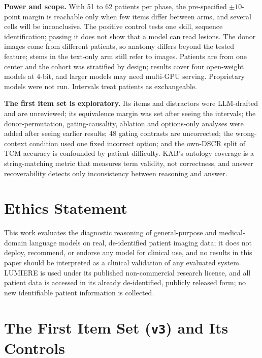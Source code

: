 \documentclass[11pt]{article}
\begin{document}
\textbf{Power and scope.} With 51 to 62 patients per phase, the pre-specified $\pm10$-point margin is reachable only when few items differ between arms, and several cells will be inconclusive. The positive control tests one skill, sequence identification; passing it does not show that a model can read lesions. The donor images come from different patients, so anatomy differs beyond the tested feature; stems in the text-only arm still refer to images. Patients are from one center and the cohort was stratified by design; results cover four open-weight models at 4-bit, and larger models may need multi-GPU serving. Proprietary models were not run. Intervals treat patients as exchangeable.

\textbf{The first item set is exploratory.} Its items and distractors were LLM-drafted and are unreviewed; its equivalence margin was set after seeing the intervals; the donor-permutation, gating-causality, ablation and options-only analyses were added after seeing earlier results; 48 gating contrasts are uncorrected; the wrong-context condition used one fixed incorrect option; and the own-DSCR split of TCM accuracy is confounded by patient difficulty. KAB's ontology coverage is a string-matching metric that measures term validity, not correctness, and answer recoverability detects only inconsistency between reasoning and answer.

\section*{Ethics Statement}

This work evaluates the diagnostic reasoning of general-purpose and medical-domain language models on real, de-identified patient imaging data; it does not deploy, recommend, or endorse any model for clinical use, and no results in this paper should be interpreted as a clinical validation of any evaluated system. LUMIERE is used under its published non-commercial research license, and all patient data is accessed in its already de-identified, publicly released form; no new identifiable patient information is collected.

%



\appendix

\section{The First Item Set (\texttt{v3}) and Its Controls}
\label{sec:app-v3}
\end{document}
